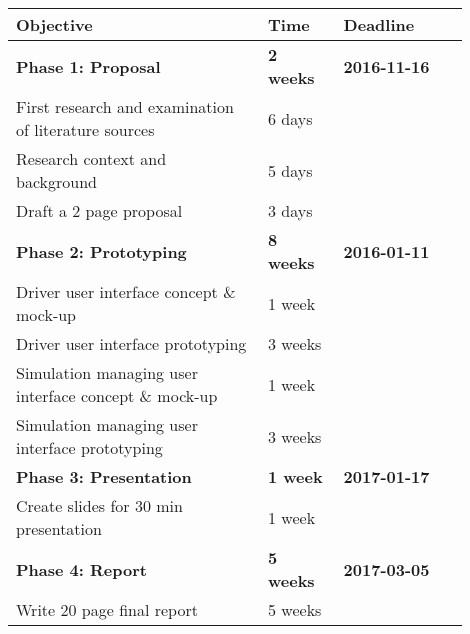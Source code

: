 \documentclass[hidelinks]{sig-alternate}
\begin{document}
\vspace{1mm}

\noindent
\def\arraystretch{1.5}
\begin{tabular}{p{0.5\linewidth} | p{0.15\linewidth} | p{0.25\linewidth}}
\rowcolor{Gray!25}
\textbf{Objective} & \textbf{Time} & \textbf{Deadline} \\\hline

\textbf{Phase 1: Proposal} & \textbf{2 weeks} & \textbf{2016-11-16} \\\hline
First research and examination of literature sources & 6 days &  \\\hline
Research context and background & 5 days &  \\\hline
Draft a 2 page proposal  & 3 days &  \\\hline

\textbf{Phase 2: Prototyping} & \textbf{8 weeks} & \textbf{2016-01-11}  \\\hline
Driver user interface concept \& mock-up& 1 week &  \\\hline
Driver user interface prototyping & 3 weeks&  \\\hline
Simulation managing user interface concept \& mock-up & 1 week&  \\\hline
Simulation managing user interface prototyping & 3 weeks &  \\\hline

\textbf{Phase 3: Presentation} & \textbf{1 week} & \textbf{2017-01-17} \\\hline
Create slides for 30 min presentation & 1 week & \\\hline

\textbf{Phase 4: Report} & \textbf{5 weeks} & \textbf{2017-03-05} \\\hline
Write 20 page final report & 5 weeks &

\end{tabular}





\end{document}
